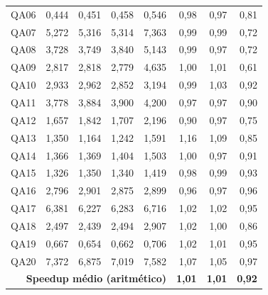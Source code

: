 \begin{longtable}{|c|r|r|r|r|r|r|r|}
QA06 & 0,444 & 0,451 & 0,458 & 0,546 & 0,98 & 0,97 & 0,81 \\
QA07 & 5,272 & 5,316 & 5,314 & 7,363 & 0,99 & 0,99 & 0,72 \\
QA08 & 3,728 & 3,749 & 3,840 & 5,143 & 0,99 & 0,97 & 0,72 \\
QA09 & 2,817 & 2,818 & 2,779 & 4,635 & 1,00 & 1,01 & 0,61 \\
QA10 & 2,933 & 2,962 & 2,852 & 3,194 & 0,99 & 1,03 & 0,92 \\
QA11 & 3,778 & 3,884 & 3,900 & 4,200 & 0,97 & 0,97 & 0,90 \\
QA12 & 1,657 & 1,842 & 1,707 & 2,196 & 0,90 & 0,97 & 0,75 \\
QA13 & 1,350 & 1,164 & 1,242 & 1,591 & 1,16 & 1,09 & 0,85 \\
QA14 & 1,366 & 1,369 & 1,404 & 1,503 & 1,00 & 0,97 & 0,91 \\
QA15 & 1,326 & 1,350 & 1,340 & 1,419 & 0,98 & 0,99 & 0,93 \\
QA16 & 2,796 & 2,901 & 2,875 & 2,899 & 0,96 & 0,97 & 0,96 \\
QA17 & 6,381 & 6,227 & 6,283 & 6,716 & 1,02 & 1,02 & 0,95 \\
QA18 & 2,497 & 2,439 & 2,494 & 2,907 & 1,02 & 1,00 & 0,86 \\
QA19 & 0,667 & 0,654 & 0,662 & 0,706 & 1,02 & 1,01 & 0,95 \\
QA20 & 7,372 & 6,875 & 7,019 & 7,582 & 1,07 & 1,05 & 0,97 \\
\hline
\multicolumn{5}{|r|}{\textbf{Speedup m\'edio (aritm\'etico)}} & \textbf{1,01} & \textbf{1,01} & \textbf{0,92} \\
\hline
\end{longtable}
